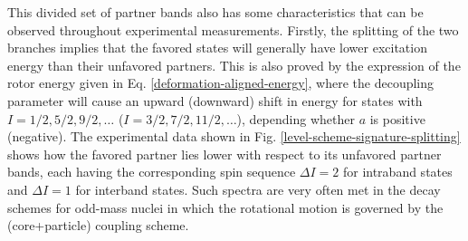 This divided set of partner bands also has some characteristics that can be observed throughout experimental measurements. Firstly, the splitting of the two branches implies that the favored states will generally have lower excitation energy than their unfavored partners. This is also proved by the expression of the rotor energy given in Eq. \ref{deformation-aligned-energy}, where the decoupling parameter will cause an upward (downward) shift in energy for states with $I=1/2,5/2,9/2,\dots$ ($I=3/2,7/2,11/2,\dots$), depending whether $a$ is positive (negative). The experimental data shown in Fig. \ref{level-scheme-signature-splitting} shows how the favored partner lies lower with respect to its unfavored partner bands, each having the corresponding spin sequence $\Delta I=2$ for intraband states and $\Delta I=1$ for interband states. Such spectra are very often met in the decay schemes for odd-mass nuclei in which the rotational motion is governed by the (core+particle) coupling scheme.
